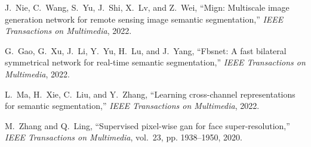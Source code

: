 \documentclass[lettersize,journal]{IEEEtran}
\begin{document}
\begin{thebibliography}{10}
J.~Nie, C.~Wang, S.~Yu, J.~Shi, X.~Lv, and Z.~Wei, ``Mign: Multiscale image
  generation network for remote sensing image semantic segmentation,''
  \emph{IEEE Transactions on Multimedia}, 2022.

G.~Gao, G.~Xu, J.~Li, Y.~Yu, H.~Lu, and J.~Yang, ``Fbsnet: A fast bilateral
  symmetrical network for real-time semantic segmentation,'' \emph{IEEE
  Transactions on Multimedia}, 2022.

L.~Ma, H.~Xie, C.~Liu, and Y.~Zhang, ``Learning cross-channel representations
  for semantic segmentation,'' \emph{IEEE Transactions on Multimedia}, 2022.

M.~Zhang and Q.~Ling, ``Supervised pixel-wise gan for face super-resolution,''
  \emph{IEEE Transactions on Multimedia}, vol.~23, pp. 1938--1950, 2020.

\end{thebibliography}
\end{document}
